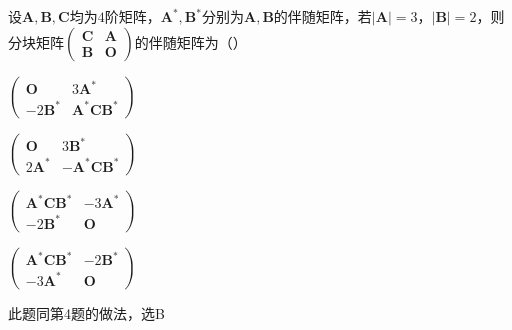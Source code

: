 \begin{question}
    设\(\mathbf{A},\bm{B},\mathbf{C}\)均为\(4\)阶矩阵，\(\mathbf{A}^{*},\mathbf{B}^{*}\)分别为\(\mathbf{A},\mathbf{B}\)的伴随矩阵，若\(\vert\mathbf{A}\vert = 3\)，\(\vert\mathbf{B}\vert = 2\)，则分块矩阵\(\left(\begin{array}{ll}\mathbf{C}&\mathbf{A}\\\mathbf{B}&\mathbf{O}\end{array}\right)\)的伴随矩阵为（\qquad ）
    \begin{choices}
        \item \(\left(\begin{array}{cc}\mathbf{O}& 3\mathbf{A}^{*}\\-2\mathbf{B}^{*}&\mathbf{A}^{*}\mathbf{C}\mathbf{B}^{*}\end{array}\right)\)
        \item \(\left(\begin{array}{cc}\mathbf{O}& 3\mathbf{B}^{*}\\2\mathbf{A}^{*}&-\mathbf{A}^{*}\mathbf{C}\mathbf{B}^{*}\end{array}\right)\)
        \item \(\left(\begin{array}{cc}\mathbf{A}^{*}\mathbf{C}\mathbf{B}^{*}& - 3\mathbf{A}^{*}\\-2\mathbf{B}^{*}&\mathbf{O}\end{array}\right)\)
        \item \(\left(\begin{array}{cc}\mathbf{A}^{*}\mathbf{C}\mathbf{B}^{*}& - 2\mathbf{B}^{*}\\-3\mathbf{A}^{*}&\mathbf{O}\end{array}\right)\)
    \end{choices}
\end{question}
\begin{solution}
    此题同第4题的做法，选B
\end{solution}
